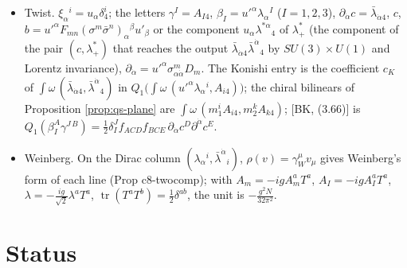 \begin{remark}
\begin{itemize}
\item Twist. $\xi_\alpha{}^i=u_\alpha\delta^i_4$; the letters $\gamma^I=A_{I4}$, $\beta_I=u'^\alpha\lambda_\alpha{}^I$ ($I=1,2,3$), $\partial_{\dot\alpha}c=\bar\lambda_{\dot\alpha4}$, $c$, $b=u'^\alpha F_{mn}(\sigma^m\bar\sigma^n)_\alpha{}^\beta u'_\beta$ or the component $u_\alpha\lambda^{*\alpha}{}_4$ of $\lambda^*_+$ (the component of the pair $(c,\lambda^*_+)$ that reaches the output $\bar\lambda_{\dot\alpha4}\bar\lambda^{\dot\alpha}{}_4$ by $SU(3)\times U(1)$ and Lorentz invariance), $\partial_{\dot\alpha}=u'^\alpha\sigma^m_{\alpha\dot\alpha}D_m$. The Konishi entry is the coefficient $c_K$ of $\int\omega\,(\bar\lambda_{\dot\alpha4},\bar\lambda^{\dot\alpha}{}_4)$ in $Q_1\big(\int\omega\,(u'^\alpha\lambda_\alpha{}^i,A_{i4})\big)$; the chiral bilinears of Proposition \ref{prop:qs-plane} are $\int\omega\,(m_1^iA_{i4},m_2^kA_{k4})$; [BK, (3.66)] is $Q_1(\beta_I^A\gamma^{J\,B})=\tfrac12\delta^J_If_{ACD}f_{BCE}\,\partial_{\dot\alpha}c^D\partial^{\dot\alpha}c^E$.
\item Weinberg. On the Dirac column $(\lambda_\alpha{}^i,\bar\lambda^{\dot\alpha}{}_i)$, $\rho(v)=\gamma_W^\mu v_\mu$ gives Weinberg's form of each line (Prop c8-twocomp); with $A_m=-igA^a_mT^a$, $A_I=-igA^a_IT^a$, $\lambda=-\tfrac{ig}{\sqrt2}\lambda^aT^a$, $\operatorname{tr}(T^aT^b)=\tfrac12\delta^{ab}$, the unit is $-\frac{g^2N}{32\pi^2}$.
\end{itemize}
\end{remark}

\section{Status}
\label{sec:qs-status}

